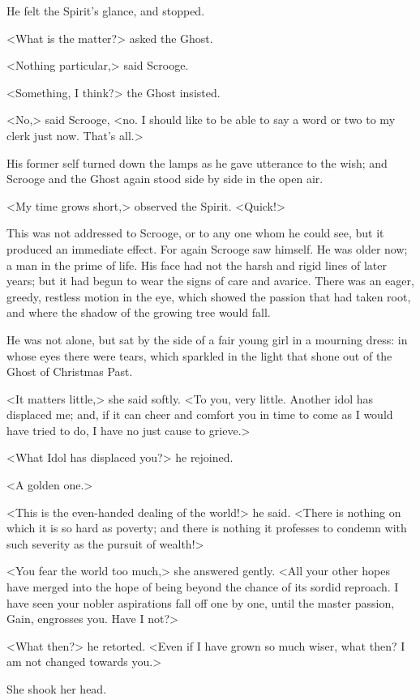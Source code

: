 He felt the Spirit's glance, and stopped.

<What is the matter?> asked the Ghost.

<Nothing particular,> said Scrooge.

<Something, I think?> the Ghost insisted.

<No,> said Scrooge, <no. I should like to be able to say a word or two to my
clerk just now. That's all.>

His former self turned down the lamps as he gave utterance to the wish; and
Scrooge and the Ghost again stood side by side in the open air.

<My time grows short,> observed the Spirit. <Quick!>

This was not addressed to Scrooge, or to any one whom he could see, but it
produced an immediate effect. For again Scrooge saw himself. He was older now; a
man in the prime of life. His face had not the harsh and rigid lines of later
years; but it had begun to wear the signs of care and avarice. There was an
eager, greedy, restless motion in the eye, which showed the passion that had
taken root, and where the shadow of the growing tree would fall.

He was not alone, but sat by the side of a fair young girl in a mourning dress:
in whose eyes there were tears, which sparkled in the light that shone out of
the Ghost of Christmas Past.

<It matters little,> she said softly. <To you, very little. Another idol has
displaced me; and, if it can cheer and comfort you in time to come as I would
have tried to do, I have no just cause to grieve.>

<What Idol has displaced you?> he rejoined.

<A golden one.>

<This is the even-handed dealing of the world!> he said. <There is nothing on
which it is so hard as poverty; and there is nothing it professes to condemn
with such severity as the pursuit of wealth!>

<You fear the world too much,> she answered gently. <All your other hopes have
merged into the hope of being beyond the chance of its sordid reproach. I have
seen your nobler aspirations fall off one by one, until the master passion,
Gain, engrosses you. Have I not?>

<What then?> he retorted. <Even if I have grown so much wiser, what then? I am
not changed towards you.>

She shook her head.

